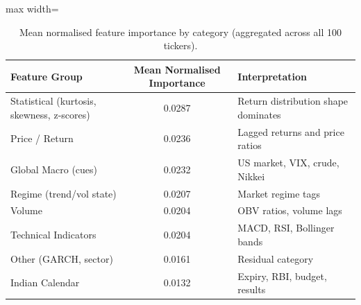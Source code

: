 \begin{table}[H]
\centering
\caption{Mean normalised feature importance by category (aggregated across all 100 tickers).}
\label{tab:feature_groups}
\renewcommand{\arraystretch}{1.3}
\begin{adjustbox}{max width=\textwidth}
\begin{tabular}{l c l}
\toprule
\textbf{Feature Group} & \textbf{Mean Normalised Importance} & \textbf{Interpretation} \\
\midrule
Statistical (kurtosis, skewness, z-scores) & 0.0287 & Return distribution shape dominates \\
Price / Return                              & 0.0236 & Lagged returns and price ratios \\
Global Macro (cues)                         & 0.0232 & US market, VIX, crude, Nikkei \\
Regime (trend/vol state)                    & 0.0207 & Market regime tags \\
Volume                                      & 0.0204 & OBV ratios, volume lags \\
Technical Indicators                        & 0.0204 & MACD, RSI, Bollinger bands \\
Other (GARCH, sector)                       & 0.0161 & Residual category \\
Indian Calendar                             & 0.0132 & Expiry, RBI, budget, results \\
\bottomrule
\end{tabular}
\end{adjustbox}
\end{table}


